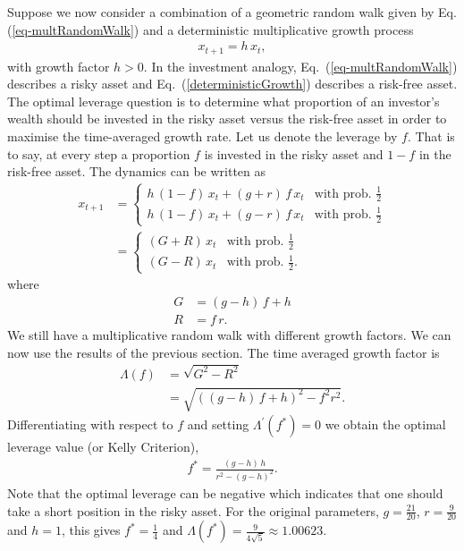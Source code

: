 \documentclass[11pt]{article}
\begin{document}
\begin{multicols}{2}
Suppose we now consider a combination of a geometric random walk  given by Eq.(\ref{eq-multRandomWalk}) and a deterministic multiplicative growth process
\begin{align}
\label{eq-deterministicGrowth}
x_{t+1} = h\, x_t, 
\end{align}
with growth factor $h>0$. 
In the investment analogy, Eq.~(\ref{eq-multRandomWalk}) describes a risky asset and Eq.~(\ref{deterministicGrowth}) describes a risk-free asset.
The optimal leverage question is to determine what proportion of an investor's wealth should be invested in the risky asset versus the risk-free asset in order to maximise the time-averaged growth rate.
Let us denote the leverage by $f$.
That is to say, at every step a proportion $f$ is invested in the risky asset and $1-f$ in the risk-free asset.
The dynamics can be written as
\begin{align}
\nonumber
x_{t+1} &= \left\{ 
\begin{array}{ll}
h\, (1-f)\, x_t + \left(g +r \right)\,f\, x_t & \text{with prob. $\frac{1}{2}$}\\
h\, (1-f)\, x_t + \left(g - r \right)\, f\, x_t  & \text{with prob. $\frac{1}{2}$}
\end{array}
\right. \\
&= \left\{ 
\begin{array}{ll}
 \left(G +R \right) \, x_t & \text{with prob. $\frac{1}{2}$}\\
 \left(G - R \right)\, x_t  & \text{with prob. $\frac{1}{2}$}.
\end{array}
\right.
\end{align}
where
\begin{align*}
G & = \left( g - h \right) \, f + h\\
R & = f\, r.
\end{align*}
We still have a multiplicative random walk with different growth factors. 
We can now use the results of the previous section. The time averaged growth factor is
\begin{align}
\nonumber \Lambda(f) & = \sqrt{G^2 - R^2}\\
&= \sqrt{( \left( g - h \right) \, f + h)^2 - f^2r^2 }.
\end{align}
Differentiating with respect to $f$ and setting $\Lambda^\prime(f^*) = 0$ we obtain the optimal leverage value (or Kelly Criterion),
\begin{align}
f^* = \frac{(g-h)\, h}{r^2 - (g-h)^2}.
\end{align}
Note that the optimal leverage can be negative which indicates that one should take a short position in the risky asset.
For the original parameters, $g=\frac{21}{20}$, $r=\frac{9}{20}$ and $h=1$, this gives $f^* = \frac{1}{4}$ and $\Lambda(f^*) = \frac{9}{4\sqrt{5}} \approx 1.00623$.
%
%


\end{multicols}
\end{document}
